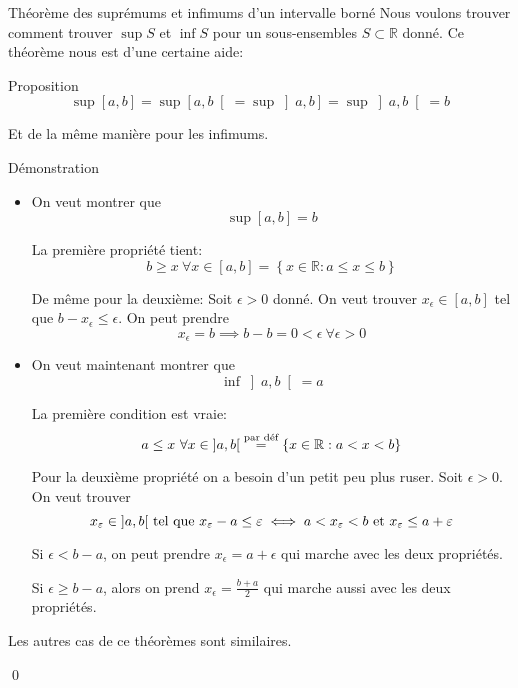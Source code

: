 \documentclass{article}
\begin{document}
\begin{parag}{Théorème des suprémums et infimums d'un intervalle borné}
    Nous voulons trouver comment trouver $\sup S$ et $\inf S$ pour un sous-ensembles $S \subset \mathbb{R}$ donné. Ce théorème nous est d'une certaine aide:
    \begin{subparag}{Proposition}
    \[\sup\left[a, b\right] = \sup\left[a, b\right[ = \sup\left]a, b\right] = \sup\left]a, b\right[ = b\]

        Et de la même manière pour les infimums.
    \end{subparag}

    \begin{subparag}{Démonstration}
        \begin{itemize}[left=0pt]
            \item[\important{(a)}] On veut montrer que
                \[\sup \left[a,b\right] = b\]

                La première propriété tient:
                \[b \geq x\ \forall x \in \left[a, b\right] = \left\{x \in \mathbb{R} : a \leq x \leq b\right\}\]

                De même pour la deuxième: Soit $\epsilon > 0$ donné. On veut trouver $x_{\epsilon} \in \left[a, b\right]$ tel que $b - x_{\epsilon} \leq \epsilon$. On peut prendre
                \[x_{\epsilon} = b \implies b-b = 0 < \epsilon\ \forall \epsilon > 0\]

            \item[\important{(b)}] On veut maintenant montrer que
                \[\inf \left]a,b\right[ = a\]

                La première condition est vraie:
                \[a \leq x \ \forall x \in \left]a, b\right[ \over{=}{\text{par déf}}  \left\{x \in \mathbb{R}: a < x < b\right\}\]

                Pour la deuxième propriété on a besoin d'un petit peu plus ruser. Soit $\epsilon > 0$. On veut trouver
                \[x_{\epsilon} \in \left]a, b\right[ \telque x_{\epsilon} - a \leq \epsilon \iff a < x_{\epsilon} < b \text{ et } x_{\epsilon} \leq a + \epsilon\]

               Si $\epsilon < b - a$, on peut prendre $x_{\epsilon} = a + \epsilon$ qui marche avec les deux propriétés.

               Si $\epsilon \geq b - a$, alors on prend $x_{\epsilon} = \frac{b + a}{2}$ qui marche aussi avec les deux propriétés.

        \end{itemize}

       Les autres cas de ce théorèmes sont similaires.

      \qed
    \end{subparag}
\end{parag}
\end{document}
